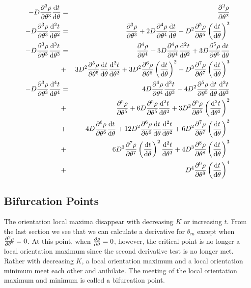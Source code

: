 \documentclass[11pt]{article} %
\begin{document}
\begin{eqnarray}
    -D \pdv[3]{\rho}{\theta} \dv{t}{\theta} & = & \pdv[2]{\rho}{\theta} \\
	-D \pdv[3]{\rho}{\theta} \dv[2]{t}{\theta} & = & \pdv[3]{\rho}{\theta} + 2 D \pdv[4]{\rho}{\theta} \dv{t}{\theta}  + D^2 \pdv[5]{\rho}{\theta} \left(\dv{t}{\theta}\right)^2 \\
	-D \pdv[3]{\rho}{\theta} \dv[3]{t}{\theta} & = & \pdv[4]{\rho}{\theta}  + 3 D \pdv[4]{\rho}{\theta} \dv[2]{t}{\theta}  + 3 D \pdv[5]{\rho}{\theta} \dv{t}{\theta}  \\
	& + & 3 D^2 \pdv[5]{\rho}{\theta} \dv{t}{\theta} \dv[2]{t}{\theta}  + 3 D^2 \pdv[6]{\rho}{\theta} \left(\dv{t}{\theta}\right)^2  + D^3 \pdv[7]{\rho}{\theta} \left(\dv{t}{\theta}\right)^3 \\
	-D \pdv[3]{\rho}{\theta} \dv[4]{t}{\theta} & = &  4 D \pdv[4]{\rho}{\theta} \dv[3]{t}{\theta}  + 4 D^2 \pdv[5]{\rho}{\theta} \dv{t}{\theta} \dv[3]{t}{\theta}  \\
	& + & \pdv[5]{\rho}{\theta}  + 6 D \pdv[5]{\rho}{\theta} \dv[2]{t}{\theta}  + 3 D^2 \pdv[5]{\rho}{\theta} \left(\dv[2]{t}{\theta}\right)^2  \\ 
	& + & 4 D \pdv[6]{\rho}{\theta} \dv{t}{\theta}  + 12 D^2 \pdv[6]{\rho}{\theta} \dv{t}{\theta} \dv[2]{t}{\theta}  + 6 D^2 \pdv[7]{\rho}{\theta} \left(\dv{t}{\theta}\right)^2\\
	& + & 6 D^3 \pdv[7]{\rho}{\theta} \left(\dv{t}{\theta}\right)^2 \dv[2]{t}{\theta}  + 4 D^3 \pdv[8]{\rho}{\theta} \left(\dv{t}{\theta}\right)^3  \\
	& + & D^4 \pdv[9]{\rho}{\theta} \left(\dv{t}{\theta}\right)^4 
\end{eqnarray}

\subsection{Bifurcation Points}

The orientation local maxima disappear with decreasing $ K $ or increasing $ t $. From the last section we see that we can calculate a derivative for $ \theta_m $ except when $ \pdv[2]{\rho}{\theta}  = 0 $. At this point, when $ \pdv{\rho}{\theta} = 0 $, however, the critical point is no longer a local orientation maximum since the second derivative test is no longer met. Rather with decreasing $ K $, a local orientation maximum and a local orientation minimum meet each other and anihilate. The meeting of the local orientation maximum and minimum is called a bifurcation point.
\end{document}
